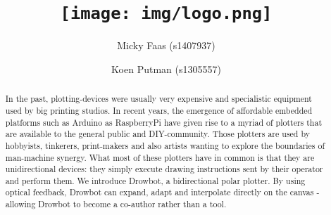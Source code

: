 \documentclass[a4paper,10pt]{article}
\title{\vspace{-7em}
\texttt{[image: img/logo.png]} \\ \vspace{.5em}
\Large \sffamily{A Suspended Polar Plotting Robot}}
\author{Micky Faas (s1407937) \and Koen Putman (s1305557)}
\date{}
\begin{document}
\maketitle
\begin{abstract}
In the past, plotting-devices were usually very expensive and specialistic equipment used by big printing studios. In recent years, the emergence of affordable embedded platforms such as Arduino as RaspberryPi have given rise to a myriad of plotters that are available to the general public and DIY-community. Those plotters are used by hobbyists, tinkerers, print-makers and also artists wanting to explore the boundaries of man-machine synergy. What most of these plotters have in common is that they are unidirectional devices: they simply execute drawing instructions sent by their operator and perform them. We introduce Drowbot, a bidirectional polar plotter. By using optical feedback, Drowbot can expand, adapt and interpolate directly on the canvas - allowing Drowbot to become a co-author rather than a tool.

\end{abstract}
\end{document}
